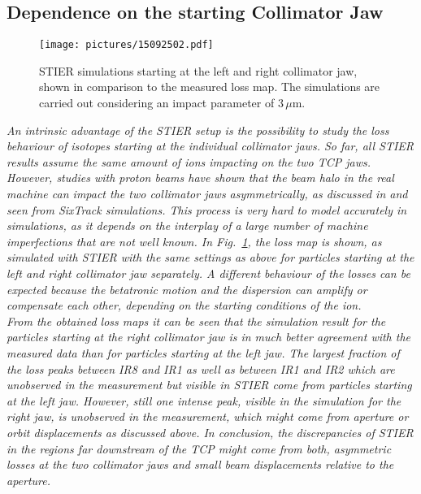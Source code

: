 \subsection{Dependence on the starting Collimator Jaw}

\begin{figure}[b]
  \begin{center}
\texttt{[image: pictures/15092502.pdf]}
\caption{STIER simulations starting at the left and right collimator jaw, shown in comparison to the measured loss map. The simulations are carried out considering an impact parameter of $3\,\mu$m. }
\label{fig:15032201.pdf}
  \end{center}
\end{figure}

\textit{An intrinsic advantage of the STIER setup is the possibility to study the loss behaviour of isotopes starting at the individual collimator jaws. So far, all STIER results assume the same amount of ions impacting on the two TCP jaws. However, studies with proton beams have shown that the beam halo in the real machine can impact the two collimator jaws asymmetrically, as discussed in \cite{Bruce2014a} and seen from SixTrack simulations. This process is very hard to model accurately in simulations, as it depends on the interplay of a large number of machine imperfections that are not well known. In Fig.~\ref{fig:15032201.pdf}, the loss map is shown, as simulated with STIER with the same settings as above for particles starting at the left and right collimator jaw separately. A different behaviour of the losses can be expected because the betatronic motion and the dispersion can amplify or compensate each other, depending on the starting conditions of the ion.
\\
From the obtained loss maps it can be seen that the simulation result for the particles starting at the right collimator jaw is in much better agreement with the measured data than for particles starting at the left jaw. The largest fraction of the loss peaks between IR8 and IR1 as well as between IR1 and IR2 which are unobserved in the measurement but visible in STIER come from particles starting at the left jaw. However, still one intense peak, visible in the simulation for the right jaw, is unobserved in the measurement, which might come from aperture or orbit displacements as discussed above. In conclusion, the discrepancies of STIER in the regions far downstream of the TCP might come from both, asymmetric losses at the two collimator jaws and small beam displacements relative to the aperture. }


